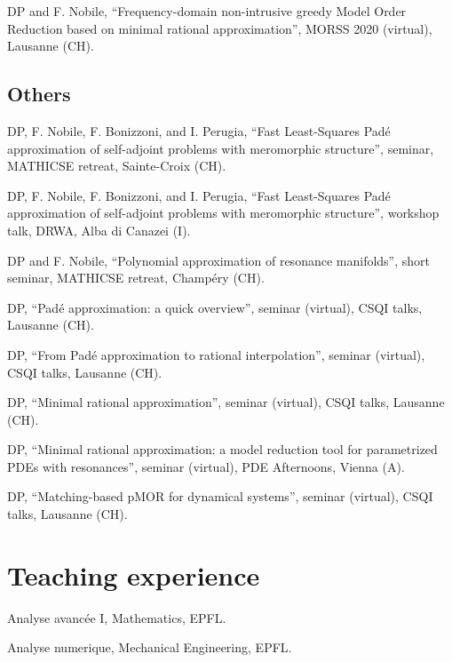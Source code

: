 \documentclass[11pt]{article} %
\begin{document}
\yearsminus DP and F. Nobile, ``Frequency-domain non-intrusive greedy Model Order Reduction based on minimal rational approximation'', MORSS 2020 (virtual), Lausanne (CH).

\subsection*{Others}

\hspace{\parindent}DP, F. Nobile, F. Bonizzoni, and I. Perugia, ``Fast Least-Squares Pad\'e approximation of self-adjoint problems with meromorphic structure'', seminar, \mbox{MATHICSE} retreat, Sainte-Croix (CH).

\yearsminus DP, F. Nobile, F. Bonizzoni, and I. Perugia, ``Fast Least-Squares Pad\'e approximation of self-adjoint problems with meromorphic structure'', workshop talk, DRWA, Alba di Canazei (I).

DP and F. Nobile, ``Polynomial approximation of resonance manifolds'', short seminar, \mbox{MATHICSE} retreat, Champ\'ery (CH).

DP, ``Pad\'e approximation: a quick overview'', seminar (virtual), CSQI talks, Lausanne (CH).

DP, ``From Pad\'e approximation to rational interpolation'', seminar (virtual), CSQI talks, Lausanne (CH).

DP, ``Minimal rational approximation'', seminar (virtual), CSQI talks, Lausanne (CH).

\yearsminus DP, ``Minimal rational approximation: a model reduction tool for parametrized PDEs with resonances'', seminar (virtual), PDE Afternoons, Vienna (A).

DP, ``Matching-based pMOR for dynamical systems'', seminar (virtual), CSQI talks, Lausanne (CH).



\section*{Teaching experience}

\hspace{\parindent}Analyse avanc\'ee I, Mathematics, EPFL.

Analyse numerique, Mechanical Engineering, EPFL.
\end{document}

